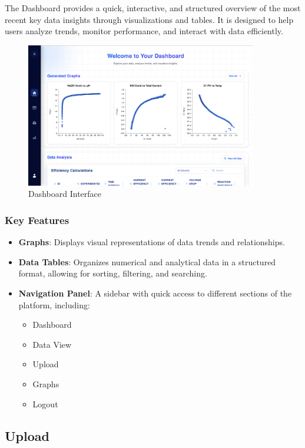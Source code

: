 \documentclass[12pt]{article}
\begin{document}
The Dashboard provides a quick, interactive, and structured overview of the most
recent key data insights through visualizations and tables. It is designed to
help users analyze trends, monitor performance, and interact with data
efficiently.

\begin{figure}[H]
    \centering
    \includegraphics[width=0.9\textwidth]{./Diagrams/Dashboard.png}
    \caption{Dashboard Interface}
\end{figure}


\subsubsection{Key Features}
\begin{itemize}
    \item \textbf{Graphs}: Displays visual representations of data trends and
    relationships.
    \item \textbf{Data Tables}: Organizes numerical and analytical data in a
    structured format, allowing for sorting, filtering, and searching.
    \item \textbf{Navigation Panel}: A sidebar with quick access to different
    sections of the platform, including:
    \begin{itemize}
        \item Dashboard
        \item Data View
        \item Upload
        \item Graphs
        \item Logout
    \end{itemize}
\end{itemize}

\subsection{Upload}
\end{document}
